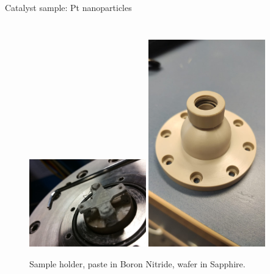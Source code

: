 \begin{frame}{Catalyst sample: Pt nanoparticles}
\begin{columns}
            \begin{figure}
                \centering %
                \includegraphics[trim=650 300 250 250, clip, width=0.45\textwidth]{Figures/sample/reactor_cell.jpeg}
                \includegraphics[trim=0 400 0 380, clip, width=0.45\textwidth]{Figures/sixs/dome_window.png}
                \caption{Sample holder, paste in Boron Nitride, wafer in Sapphire.}
                \label{fig:sample_and_dome}
            \end{figure}

            \pause
            

\end{columns}
\end{frame}
